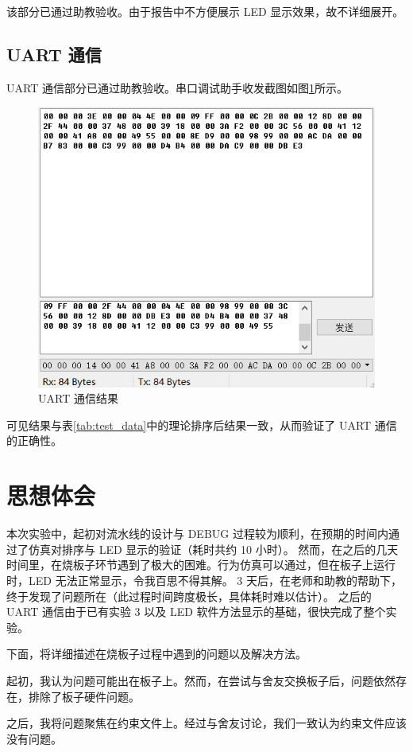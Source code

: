 \documentclass[a4paper]{article}  %
\begin{document}
该部分已通过助教验收。由于报告中不方便展示 LED 显示效果，故不详细展开。

\subsection{UART 通信}

UART 通信部分已通过助教验收。串口调试助手收发截图如图\ref{fig:uart_result}所示。

\begin{figure}[ht]
    \centering
    \includegraphics[width=.7\textwidth]{asserts/uart_result.png}
    \caption{
        UART 通信结果
    }\label{fig:uart_result}
\end{figure}

可见结果与表\ref{tab:test_data}中的理论排序后结果一致，从而验证了 UART 通信的正确性。

\section{思想体会}

本次实验中，起初对流水线的设计与 DEBUG 过程较为顺利，在预期的时间内通过了仿真对排序与 LED 显示的验证（耗时共约 10 小时）。
然而，在之后的几天时间里，在烧板子环节遇到了极大的困难。行为仿真可以通过，但在板子上运行时，LED 无法正常显示，令我百思不得其解。
3 天后，在老师和助教的帮助下，终于发现了问题所在（此过程时间跨度极长，具体耗时难以估计）。
之后的 UART 通信由于已有实验 3 以及 LED 软件方法显示的基础，很快完成了整个实验。

下面，将详细描述在烧板子过程中遇到的问题以及解决方法。

起初，我认为问题可能出在板子上。然而，在尝试与舍友交换板子后，问题依然存在，排除了板子硬件问题。

之后，我将问题聚焦在约束文件上。经过与舍友讨论，我们一致认为约束文件应该没有问题。
\end{document}
